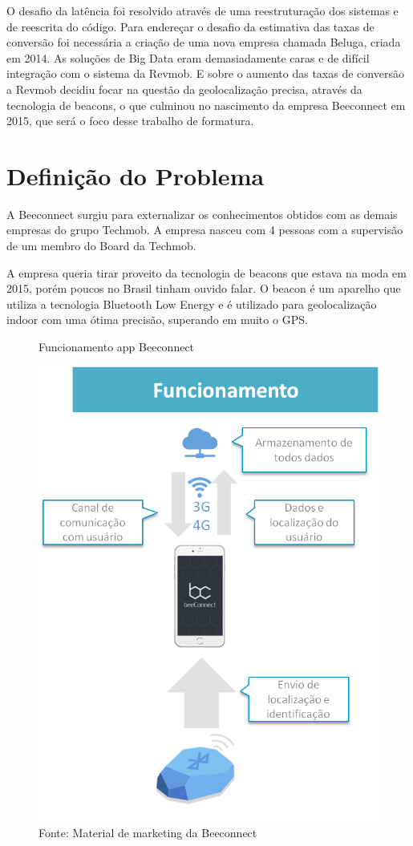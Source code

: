 O desafio da latência foi resolvido através de uma reestruturação dos sistemas e de reescrita do código. Para endereçar o desafio da estimativa das taxas de conversão foi necessária a criação de uma nova empresa chamada Beluga, criada em 2014. As soluções de Big Data eram demasiadamente caras e de difícil integração com o sistema da Revmob. E sobre o aumento das taxas de conversão a Revmob decidiu focar na questão da geolocalização precisa, através da tecnologia de beacons, o que culminou no nascimento da empresa Beeconnect em 2015, que será o foco desse trabalho de formatura.

\section{Definição do Problema}
\label{cha:problema}
A Beeconnect surgiu para externalizar os conhecimentos obtidos com as demais empresas do grupo Techmob. A empresa nasceu com 4 pessoas com a supervisão de um membro do Board da Techmob.

A empresa queria tirar proveito da tecnologia de beacons que estava na moda em 2015, porém poucos no Brasil tinham ouvido falar. O beacon é um aparelho que utiliza a tecnologia Bluetooth Low Energy e é utilizado para geolocalização indoor com uma ótima precisão, superando em muito o GPS.
\begin{figure}[H]
\caption{Funcionamento app Beeconnect}
\centerline{\includegraphics[scale=0.5]{img/explicacaoBeeconnect}}
\label{fig:explicacaoBeeconnect}
\caption* {Fonte: Material de marketing da Beeconnect}
\end{figure}

